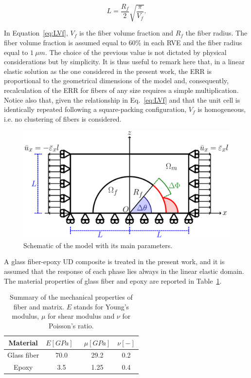 \documentclass[smallextended]{svjour3}       %
\begin{document}
\begin{equation}\label{eq:LVf}
L=\frac{R_{f}}{2}\sqrt{\frac{\pi}{V_{f}}}.
\end{equation}

In Equation~\ref{eq:LVf}, $V_{f}$ is the fiber volume fraction and $R_{f}$ the fiber radius. The fiber volume fraction is assumed equal to $60\%$ in each RVE and the fiber radius equal to $1\ \mu m$. The choice of the previous value is not dictated by physical considerations but by simplicity. It is thus useful to remark here that, in a linear elastic solution as the one considered in the present work, the ERR is proportional to the geometrical dimensions of the model and, consequently, recalculation of the ERR for fibers of any size requires a simple multiplication. Notice also that, given the relationship in Eq.~\ref{eq:LVf} and that the unit cell is identically repeated following a square-packing configuration, $V_{f}$ is homogeneous, i.e. no clustering of fibers is considered.

\begin{figure}[!h]
\centering
\includegraphics[width=\textwidth]{RUC.pdf}
\caption{Schematic of the model with its main parameters.}\label{fig:modelschem}
\end{figure}

A glass fiber-epoxy UD composite is treated in the present work, and it is assumed that the response of each phase lies always in the linear elastic domain. The material properties of glass fiber and epoxy are reported in Table~\ref{tab:phaseprop}.

\begin{table}[!htbp]
 \centering
 \caption{Summary of the mechanical properties of fiber and matrix. $E$ stands for Young's modulus, $\mu$ for shear modulus and $\nu$ for Poisson's ratio.}
 \begin{tabular}{cccc}
\textbf{Material} & \textbf{$E\left[GPa\right]$}\ & \textbf{$\mu\left[GPa\right]$} & \textbf{$\nu\left[-\right]$} \\
\midrule
Glass fiber    & 70.0  & 29.2   & 0.2  \\
Epoxy    & 3.5    & 1.25   & 0.4
\end{tabular}
\label{tab:phaseprop}
\end{table}
\end{document}
